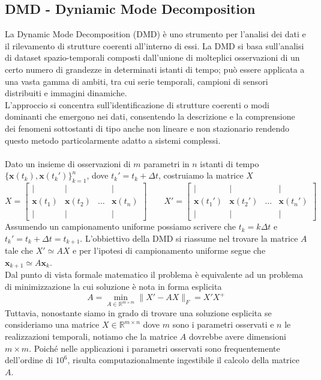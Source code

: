 \documentclass[11pt]{article}
\newcommand{\R}{\mathbb{R}} %
\begin{document}
\subsection{DMD - Dyniamic Mode Decomposition}
La Dynamic Mode Decomposition (DMD) è uno strumento per l'analisi dei dati  e il rilevamento di strutture coerenti all'interno di essi. La DMD si basa sull'analisi di dataset spazio-temporali composti dall'unione di molteplici osservazioni di un certo numero di grandezze in determinati istanti di tempo; può essere applicata a una vasta gamma di ambiti, tra cui serie temporali, campioni di sensori distribuiti e immagini dinamiche.\\ L'approccio si concentra sull'identificazione di strutture coerenti o modi dominanti che emergono nei dati, consentendo la descrizione e la comprensione dei fenomeni  sottostanti  di tipo anche non lineare e non stazionario rendendo questo metodo particolarmente adatto a sistemi complessi.\\
\\
Dato un insieme di osservazioni di $m$ parametri in $n$ istanti di tempo $\{\mathbf{x}(t_k),\mathbf{x}(t_k')\}_{k=1}^n$, dove $t_k'=t_k + \Delta t$,  costruiamo la matrice $X$
$$ X= \begin{bmatrix}
| & | &  & | \\
\mathbf{x}(t_1) & \mathbf{x}(t_2) & \dots & \mathbf{x}(t_n)\\
| & | & & |
\end{bmatrix} \quad \quad
X'= \begin{bmatrix}
| & | &  & | \\
\mathbf{x}(t_1') & \mathbf{x}(t_2') & \dots & \mathbf{x}(t_n')\\
| & | & & |
\end{bmatrix}
$$
Assumendo un campionamento uniforme possiamo scrivere che $t_k=k\Delta t$ e $t_k'= t_k+\Delta t=t_{k+1}$.
L'obbiettivo della DMD si riassume nel trovare la matrice $A$ tale che $X' \simeq AX$ e per l'ipotesi di campionamento uniforme segue che $\mathbf{x}_{k+1} \simeq A\mathbf{x}_k$.\\
Dal punto di vista formale matematico il problema è equivalente ad un problema di minimizzazione la cui soluzione è nota in forma esplicita $$ A= \min_{A \in \R^{m \times m}}{\|X' -AX\|_F =X'X^+} $$
Tuttavia, nonostante siamo in grado di trovare una soluzione esplicita se consideriamo una matrice $X \in \mathbb{R}^{m \times n}$ dove $m$ sono i parametri osservati e $n$ le realizzazioni temporali, notiamo che la matrice $A$ dovrebbe avere dimensioni $m \times m$. Poiché nelle applicazioni i parametri osservati sono frequentemente dell'ordine di $10^6$, risulta computazionalmente ingestibile il calcolo della matrice $A$.
\end{document}
